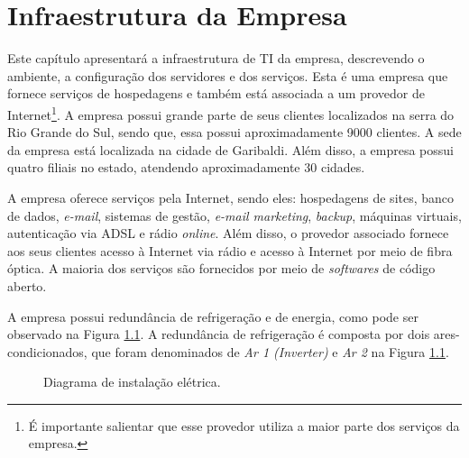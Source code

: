 \chapter{Infraestrutura da Empresa}
\label{cap:infraempresa}

Este capítulo apresentará a infraestrutura de \ac{TI} da empresa, descrevendo o ambiente, a configuração dos servidores e dos serviços. Esta é 
uma empresa que fornece serviços de hospedagens e também está associada a um provedor de Internet\footnote[1]{É importante salientar que esse 
provedor utiliza a maior parte dos serviços da empresa.}. A empresa possui grande parte de seus clientes localizados na serra do Rio Grande do Sul, 
sendo que, essa possui aproximadamente 9000 clientes. A sede da empresa está localizada na cidade de Garibaldi. Além disso, 
a empresa possui quatro filiais no estado, atendendo aproximadamente 30 cidades.

A empresa oferece serviços pela Internet, sendo eles: hospedagens de sites, banco de dados, \textit{e-mail}, sistemas de gestão, 
\textit{e-mail marketing}, \textit{backup}, máquinas virtuais, autenticação via \ac{ADSL} e rádio \textit{online}. Além disso, o provedor 
associado fornece aos seus clientes acesso à Internet via rádio e acesso à Internet por meio de fibra óptica. 
A maioria dos serviços são fornecidos por meio de \textit{softwares} de código aberto.

A empresa possui redundância de refrigeração e de energia, como pode ser observado na Figura \ref{fig:insteletrica}. 
A redundância de refrigeração é composta por dois ares-condicionados, que foram denominados de \textit{Ar 1 (Inverter)} e \textit{Ar 2} na 
Figura \ref{fig:insteletrica}.

\begin{figure}[h!]
 \centering
 \caption{Diagrama de instalação elétrica.}
 \label{fig:insteletrica}
\end{figure}

